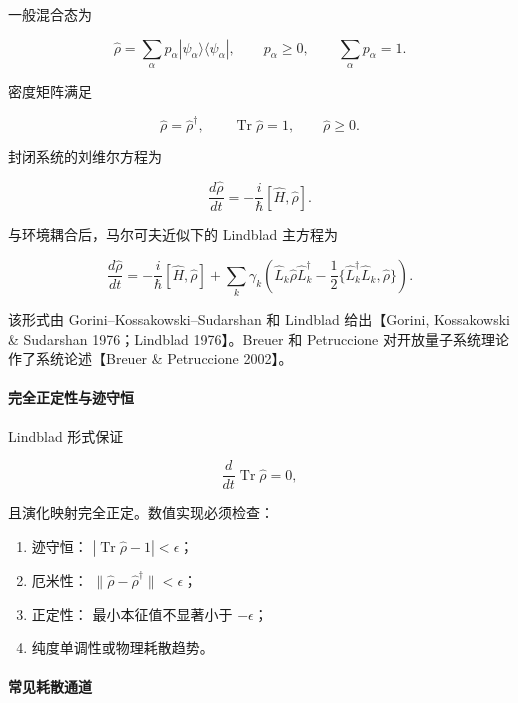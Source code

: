 \documentclass[
]{ctexbook}
\providecommand{\tightlist}{%
  \setlength{\itemsep}{0pt}\setlength{\parskip}{0pt}}
\begin{document}
一般混合态为

\[
\hat\rho
=
\sum_\alpha p_\alpha
|\psi_\alpha\rangle\langle\psi_\alpha|,
\qquad
p_\alpha\ge0,
\qquad
\sum_\alpha p_\alpha=1.
\]

密度矩阵满足

\[
\hat\rho=\hat\rho^{\dagger},
\qquad
\operatorname{Tr}\hat\rho=1,
\qquad
\hat\rho\ge0.
\]

封闭系统的刘维尔方程为

\[
\frac{d\hat\rho}{dt}
=
-\frac{i}{\hbar}[\hat H,\hat\rho].
\]

与环境耦合后，马尔可夫近似下的 Lindblad 主方程为

\[
\frac{d\hat\rho}{dt}
=
-\frac{i}{\hbar}[\hat H,\hat\rho]
+
\sum_k\gamma_k
\left(
\hat L_k\hat\rho\hat L_k^{\dagger}
-
\frac12
\{\hat L_k^{\dagger}\hat L_k,\hat\rho\}
\right).
\]

该形式由 Gorini--Kossakowski--Sudarshan 和 Lindblad 给出【Gorini,
Kossakowski \& Sudarshan 1976；Lindblad 1976】。Breuer 和 Petruccione
对开放量子系统理论作了系统论述【Breuer \& Petruccione 2002】。

\hypertarget{ux5b8cux5168ux6b63ux5b9aux6027ux4e0eux8ff9ux5b88ux6052}{%
\paragraph{完全正定性与迹守恒}\label{ux5b8cux5168ux6b63ux5b9aux6027ux4e0eux8ff9ux5b88ux6052}}

Lindblad 形式保证

\[
\frac{d}{dt}\operatorname{Tr}\hat\rho=0,
\]

且演化映射完全正定。数值实现必须检查：

\begin{enumerate}
\def\labelenumi{\arabic{enumi}.}
\tightlist
\item
  迹守恒： \(|\operatorname{Tr}\hat\rho-1|<\epsilon\)；
\item
  厄米性： \(\|\hat\rho-\hat\rho^{\dagger}\|<\epsilon\)；
\item
  正定性： 最小本征值不显著小于 \(-\epsilon\)；
\item
  纯度单调性或物理耗散趋势。
\end{enumerate}

\hypertarget{ux5e38ux89c1ux8017ux6563ux901aux9053}{%
\paragraph{常见耗散通道}\label{ux5e38ux89c1ux8017ux6563ux901aux9053}}
\end{document}
